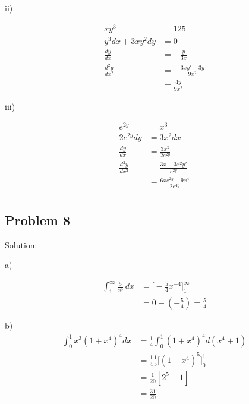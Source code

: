 \documentclass[letterpaper, 11pt]{article}
\newcommand{\1}{\mathds{1}}	%
\theoremstyle{definition}
\begin{document}
  ii)

  \begin{align*}
    xy ^{3}                 & = 125                         \\
    y ^{3} dx + 3xy ^{2}dy  & = 0                           \\
    \frac{dy}{dx}           & = -\frac{y}{3x}               \\
    \frac{d ^{2}y}{dx ^{2}} & = - \frac{3xy' - 3y}{9x ^{2}} \\
                            & = \frac{4y}{9x ^{2}}
  \end{align*}


  iii)

  \begin{align*}
    e ^{2y}                 & = x ^{3}                               \\
    2e ^{2y} dy             & = 3x ^{2} dx                           \\
    \frac{dy}{dx}           & = \frac{3x ^{2}}{2e ^{2y}}             \\
    \frac{d ^{2}y}{dx ^{2}} & = \frac{3x - 3x ^{2}y'}{e ^{2y}}       \\
                            & = \frac{6xe ^{2y} - 9x ^{4}}{2e ^{4y}} \\
  \end{align*}

  \subsection*{Problem 8}

  Solution:

  a)

  \begin{align*}
    \int_{1}^{\infty } \frac{5}{x ^{5}} \, dx & = \Big[- \frac{5}{4}x ^{-4}\Big]_{1}^{\infty} \\
                                              & = 0-(-\frac{5}{4}) = \frac{5}{4}
  \end{align*}

  b)
  \begin{align*}
    \int_{0}^{1} x ^{3}(1 +x ^{4})^{4} dx & = \frac{1}{4}\int_{0}^{1}(1+x ^{4})^{4} d(x ^{4}+1)          \\
                                          & = \frac{1}{4} \frac{1}{5} \Big[(1+x ^{4} )^{5} \Big]_{0}^{1} \\
                                          & = \frac{1}{20}[2 ^{5} - 1]                                   \\
                                          & = \frac{31}{20}
  \end{align*}
\end{document}

